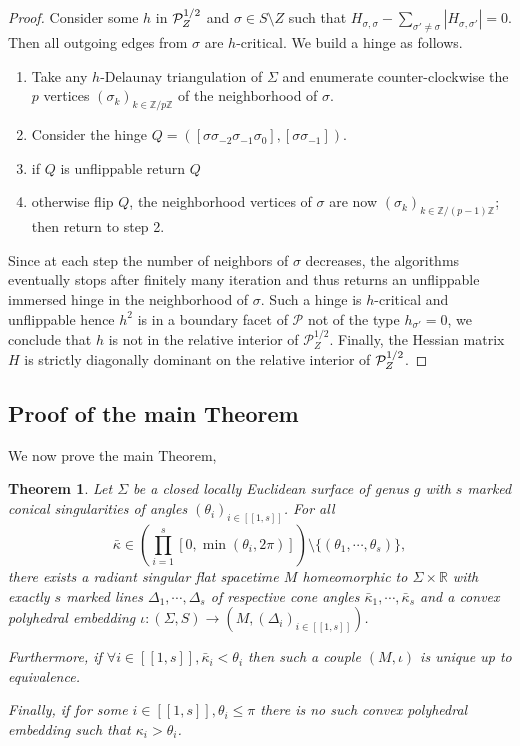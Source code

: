 \documentclass[a4paper,12pt]{article}
\def\Z{\mathbb{Z}}
\def\lsem{[\![}
\def\rsem{]\!]}
\def\adm{\P}
\def\RR{\mathbb{R}}
\def\Z{\mathbb Z}
\def\adm{\mathcal{P}}
\def\P{\mathcal{P}}
\newtheorem{theo}{Theorem}	%
\theoremstyle{definition}
\begin{document}
\begin{proof}
					
					Consider some $h$ in $\Psq_Z$ and $\sigma\in S\setminus Z$ such that $ H_{\sigma,\sigma} - \sum_{\sigma'\neq \sigma} |H_{\sigma,\sigma'}| = 0$. Then all outgoing edges from $\sigma$ are $h$-critical. We build a hinge as follows.
					\begin{enumerate}
					 \item Take any $h$-Delaunay triangulation of $\Sigma$ and enumerate counter-clockwise the $p$ vertices $(\sigma_k)_{k\in \Z/p\Z}$ of the neighborhood of $\sigma$. 
					 \item Consider the hinge $Q = ([\sigma\sigma_{-2}\sigma_{-1}\sigma_0],[\sigma\sigma_{-1}])$.
					 \item if $Q$ is unflippable return $Q$
					 \item otherwise flip $Q$, the neighborhood vertices of $\sigma$ are now $(\sigma_k)_{k\in \Z/(p-1)\Z}$; then return to step 2.
					 
					\end{enumerate}
                    Since at each step the number of neighbors of $\sigma$ decreases, the algorithms eventually stops after finitely many iteration and thus returns an unflippable immersed hinge in the neighborhood of $\sigma$.
					Such a hinge is $h$-critical and unflippable hence $h^2$ is in a boundary facet of $\adm$ not of the type $h_{\sigma'}=0$, we conclude that  $h$ is not in the relative interior of $\adm_Z^{1/2}$. Finally, the Hessian matrix $H$ is strictly diagonally dominant on the relative interior of $\Psq_Z$.
					\end{proof}
		\subsection{Proof of the main Theorem}
			\label{sec:conclusion_alexandrov}

			We now prove the main Theorem, 
			\begin{theo} \label{theo:main}
				Let $\Sigma$ be a closed locally Euclidean surface of genus $g$ with $s$ marked conical singularities of angles $(\theta_i)_{i\in \lsem 1,s\rsem}$.
				For all 
				$$\bar\kappa\in \left(\prod_{i=1}^s[0,\min(\theta_i,2\pi)]\right)\setminus \{(\theta_1,\cdots,\theta_s)\},$$ there exists a radiant singular flat spacetime $M$ homeomorphic to $\Sigma\times \RR$ with exactly $s$ marked lines $\Delta_1,\cdots,\Delta_s$ of respective cone angles $\bar\kappa_1,\cdots,\bar\kappa_s$ and
				a convex polyhedral embedding $\iota: (\Sigma, S) \rightarrow (M,(\Delta_i)_{i\in \lsem 1,s\rsem})$. 
				
				Furthermore, if $\forall i\in\lsem 1,s\rsem,\bar\kappa_i<\theta_i$ then such a couple $(M,\iota)$ is unique up to equivalence.
				
				Finally, if for some $i\in \lsem 1,s\rsem,\theta_i\leq\pi$ there is no such convex polyhedral embedding such that $\kappa_i>\theta_i$.
			\end{theo}
			
\end{document}
